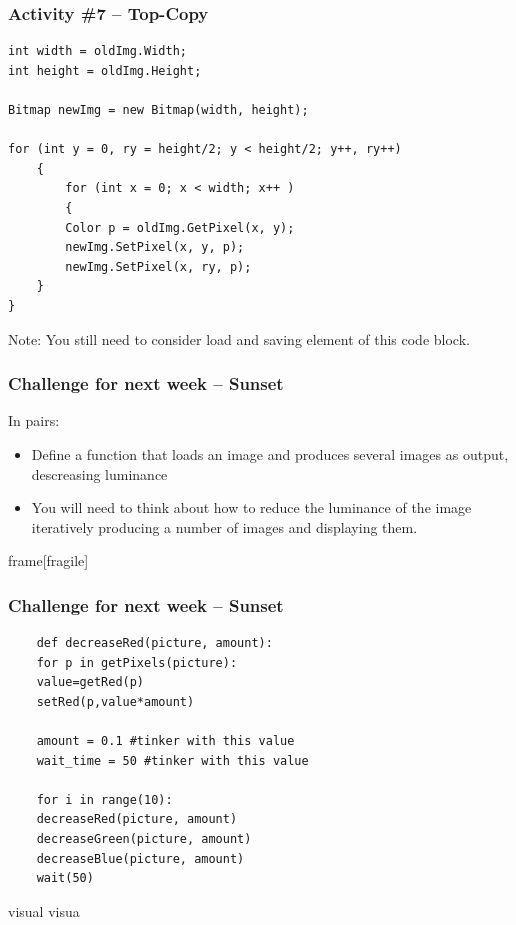 \begin{frame}[fragile]
	\frametitle{Activity \#7 -- Top-Copy}
	
	\begin{lstlisting}
int width = oldImg.Width;
int height = oldImg.Height;

Bitmap newImg = new Bitmap(width, height);

for (int y = 0, ry = height/2; y < height/2; y++, ry++)
	{
		for (int x = 0; x < width; x++ )
		{
		Color p = oldImg.GetPixel(x, y);
		newImg.SetPixel(x, y, p);
		newImg.SetPixel(x, ry, p);    
	}
}	
	\end{lstlisting}
	
	Note: You still need to consider load and saving element of this code block.
	
\end{frame}
\begin{frame}
	\frametitle{Challenge for next week -- Sunset}
	
	In pairs:
	
	\vspace{2em}
	
	\begin{itemize}
		\item Define a function that loads an image and produces several images as output, descreasing luminance
		\item You will need to think about how to reduce the luminance of the image iteratively producing a number of images and displaying them.
	\end{itemize}
\end{frame}

\begin{frame}
	{frame}[fragile]
	\frametitle{Challenge for next week -- Sunset}
	
	\begin{lstlisting}
	def decreaseRed(picture, amount):
	for p in getPixels(picture):
	value=getRed(p)
	setRed(p,value*amount)
	
	amount = 0.1 #tinker with this value
	wait_time = 50 #tinker with this value    
	
	for i in range(10):
	decreaseRed(picture, amount)
	decreaseGreen(picture, amount)
	decreaseBlue(picture, amount)
	wait(50)
	\end{lstlisting}visual visua
	
\end{frame}


